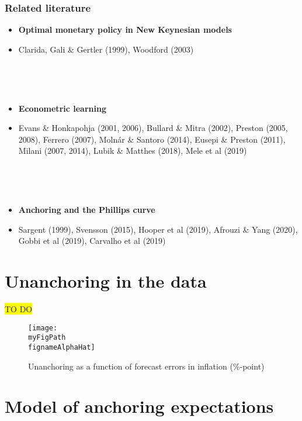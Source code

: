 \documentclass[11pt]{beamer}
\def \myFigPath {../../../figures/}
\def\mySmallerFigScale{0.18}
\def\fignameAlphaHat{alph_opt_constant_only_pi_only_N_100_nfe_5_loss_0_gridspacing_uniform_Wdiffs2_100000_Wmid_0_Nestimations_command_GMM_LOMgain_univariate_23_Jul_2020}
\begin{document}
\begin{frame}
	\frametitle{Related literature}

\begin{itemize}
\item \textbf{Optimal monetary policy in New Keynesian models}
\item[] Clarida, Gali \& Gertler (1999), Woodford (2003)

\

\

\item \textbf{Econometric learning}
\item[] Evans \& Honkapohja (2001, 2006), Bullard \& Mitra (2002), Preston (2005, 2008), Ferrero (2007), Moln\'ar \& Santoro (2014), Eusepi \& Preston (2011), Milani (2007, 2014), Lubik \& Matthes (2018), Mele et al (2019)

\

\

\item \textbf{Anchoring and the Phillips curve} 
\item[] Sargent (1999), Svensson (2015), Hooper et al (2019), Afrouzi \& Yang (2020), Gobbi et al (2019), Carvalho et al (2019)
\end{itemize}



\end{frame}

\section{Unanchoring in the data}

\begin{frame}
	
	\colorbox{yellow}{TO DO}

\begin{figure}[h!]
\texttt{[image: \\myFigPath \\fignameAlphaHat]}
\caption{Unanchoring as a function of forecast errors in inflation (\%-point)}
\label{epi}
\end{figure}


\end{frame}

\section{Model of anchoring expectations}
\end{document}
